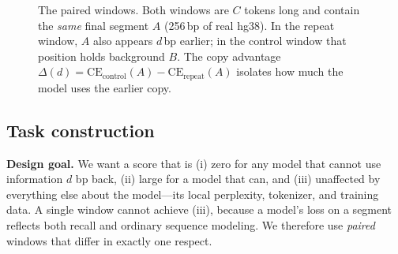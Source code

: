 \begin{figure}[t]
\centering
{}
\caption{The paired windows. Both windows are $C$ tokens long and contain the \emph{same}
final segment $A$ (256\,bp of real hg38). In the repeat window, $A$ also appears $d$\,bp
earlier; in the control window that position holds background $B$. The copy advantage
$\Delta(d)=\mathrm{CE}_{\text{control}}(A)-\mathrm{CE}_{\text{repeat}}(A)$ isolates how much
the model uses the earlier copy.}
\label{fig:protocol}
\end{figure}

\subsection{Task construction}
\label{sec:construction}

\textbf{Design goal.} We want a score that is (i) zero for any model that cannot use
information $d$ bp back, (ii) large for a model that can, and (iii) unaffected by everything
else about the model---its local perplexity, tokenizer, and training data. A single window
cannot achieve (iii), because a model's loss on a segment reflects both recall and ordinary
sequence modeling. We therefore use \emph{paired} windows that differ in exactly one respect.

